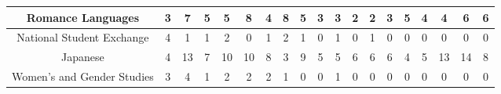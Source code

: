 \documentclass[10pt]{article}
\begin{document}
\begin{landscape}
\begin{longtable}[c]{|ccccccccccccccccccc|}
	\multicolumn{1}{|c|}{Romance Languages}                          & \multicolumn{1}{c|}{3}          & \multicolumn{1}{c|}{7}          & \multicolumn{1}{c|}{5}          & \multicolumn{1}{c|}{5}          & \multicolumn{1}{c|}{8}          & \multicolumn{1}{c|}{4}          & \multicolumn{1}{c|}{8}          & \multicolumn{1}{c|}{5}          & \multicolumn{1}{c|}{3}          & \multicolumn{1}{c|}{3}          & \multicolumn{1}{c|}{2}          & \multicolumn{1}{c|}{2}          & \multicolumn{1}{c|}{3}          & \multicolumn{1}{c|}{5}          & \multicolumn{1}{c|}{4}          & \multicolumn{1}{c|}{4}          & \multicolumn{1}{c|}{6}          & 6          \\ \hline
	\multicolumn{1}{|c|}{National Student Exchange}                  & \multicolumn{1}{c|}{4}          & \multicolumn{1}{c|}{1}          & \multicolumn{1}{c|}{1}          & \multicolumn{1}{c|}{2}          & \multicolumn{1}{c|}{0}          & \multicolumn{1}{c|}{1}          & \multicolumn{1}{c|}{2}          & \multicolumn{1}{c|}{1}          & \multicolumn{1}{c|}{0}          & \multicolumn{1}{c|}{1}          & \multicolumn{1}{c|}{0}          & \multicolumn{1}{c|}{1}          & \multicolumn{1}{c|}{0}          & \multicolumn{1}{c|}{0}          & \multicolumn{1}{c|}{0}          & \multicolumn{1}{c|}{0}          & \multicolumn{1}{c|}{0}          & 0          \\ \hline
	\multicolumn{1}{|c|}{Japanese}                                   & \multicolumn{1}{c|}{4}          & \multicolumn{1}{c|}{13}         & \multicolumn{1}{c|}{7}          & \multicolumn{1}{c|}{10}         & \multicolumn{1}{c|}{10}         & \multicolumn{1}{c|}{8}          & \multicolumn{1}{c|}{3}          & \multicolumn{1}{c|}{9}          & \multicolumn{1}{c|}{5}          & \multicolumn{1}{c|}{5}          & \multicolumn{1}{c|}{6}          & \multicolumn{1}{c|}{6}          & \multicolumn{1}{c|}{6}          & \multicolumn{1}{c|}{4}          & \multicolumn{1}{c|}{5}          & \multicolumn{1}{c|}{13}         & \multicolumn{1}{c|}{14}         & 8          \\ \hline
	\multicolumn{1}{|c|}{Women's and Gender Studies}                 & \multicolumn{1}{c|}{3}          & \multicolumn{1}{c|}{4}          & \multicolumn{1}{c|}{1}          & \multicolumn{1}{c|}{2}          & \multicolumn{1}{c|}{2}          & \multicolumn{1}{c|}{2}          & \multicolumn{1}{c|}{1}          & \multicolumn{1}{c|}{0}          & \multicolumn{1}{c|}{0}          & \multicolumn{1}{c|}{1}          & \multicolumn{1}{c|}{0}          & \multicolumn{1}{c|}{0}          & \multicolumn{1}{c|}{0}          & \multicolumn{1}{c|}{0}          & \multicolumn{1}{c|}{0}          & \multicolumn{1}{c|}{0}          & \multicolumn{1}{c|}{0}          & 0          \\ \hline

\end{longtable}
\end{landscape}
\end{document}
